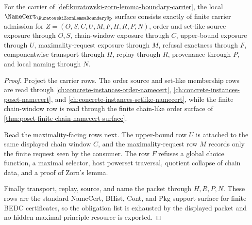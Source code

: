 \begin{theorem}
\label{thm:kuratowski-zorn-lemma-boundary-namecert-obligations}
For the carrier of \autoref{def:kuratowski-zorn-lemma-boundary-carrier}, the local $\NameCert_{\KuratowskiZornLemmaBoundaryUp}$ surface consists exactly of finite carrier admission for $Z=(O,S,C,U,M,F,H,R,P,N)$, order and set-like source exposure through $O,S$, chain-window exposure through $C$, upper-bound exposure through $U$, maximality-request exposure through $M$, refusal exactness through $F$, componentwise transport through $H$, replay through $R$, provenance through $P$, and local naming through $N$.
\end{theorem}
\begin{proof}
Project the carrier rows. The order source and set-like membership rows are read through \autoref{ch:concrete-instances-order-namecert}, \autoref{ch:concrete-instances-poset-namecert}, and \autoref{ch:concrete-instances-setlike-namecert}, while the finite chain-window row is read through the finite chain-like order surface of \autoref{thm:poset-finite-chain-namecert-surface}.

Read the maximality-facing rows next. The upper-bound row $U$ is attached to the same displayed chain window $C$, and the maximality-request row $M$ records only the finite request seen by the consumer. The row $F$ refuses a global choice function, a maximal selector, host powerset traversal, quotient collapse of chain data, and a proof of Zorn's lemma.

Finally transport, replay, source, and name the packet through $H,R,P,N$. These rows are the standard NameCert, BHist, Cont, and Pkg support surface for finite BEDC certificates, so the obligation list is exhausted by the displayed packet and no hidden maximal-principle resource is exported.
\end{proof}

